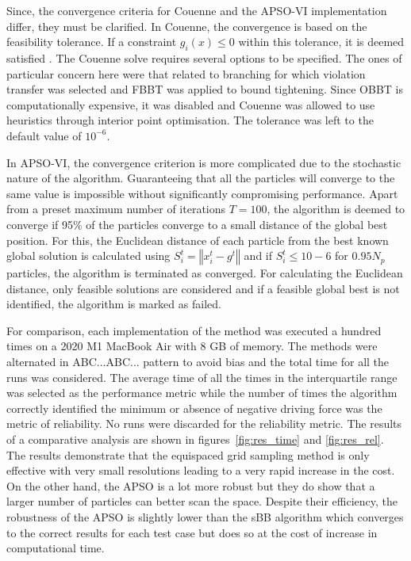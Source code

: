	Since, the convergence criteria for Couenne and the APSO-VI implementation differ, they must be clarified. In Couenne, the convergence is based on the feasibility tolerance. If a constraint $g_i(x) \leq 0$ within this tolerance, it is deemed satisfied \cite{Belotti:2022aa}. The Couenne solve requires several options to be specified. The ones of particular concern here were that related to branching for which violation transfer was selected and FBBT was applied to bound tightening. Since OBBT is computationally expensive, it was disabled and Couenne was allowed to use heuristics through interior point optimisation. The tolerance was left to the default value of ${10^{-6}}$.
	
	In APSO-VI, the convergence criterion is more complicated due to the stochastic nature of the algorithm. Guaranteeing that all the particles will converge to the same value is impossible without significantly compromising performance. Apart from a preset maximum number of iterations $T = 100$, the algorithm is deemed to converge if 95\% of the particles converge to a small distance of the global best position. For this, the Euclidean distance of each particle from the best known global solution is calculated using $S_i^t = \left \Vert x_i^t - g^t\right \Vert$ and if $S_i^t \leq 10-6$ for $0.95 N_p$ particles, the algorithm is terminated as converged. For calculating the Euclidean distance, only feasible solutions are considered and if a feasible global best is not identified, the algorithm is marked as failed.
	
	For comparison, each implementation of the method was executed a hundred times on a 2020 M1 MacBook Air with 8 GB of memory. The methods were alternated in ABC...ABC... pattern to avoid bias and the total time for all the runs was considered. The average time of all the times in the interquartile range was selected as the performance metric while the number of times the algorithm correctly identified the minimum or absence of negative driving force was the metric of reliability. No runs were discarded for the reliability metric. The results of a comparative analysis are shown in figures~\ref{fig:res_time} and \ref{fig:res_rel}. The results demonstrate that the equispaced grid sampling method is only effective with very small resolutions leading to a very rapid increase in the cost. On the other hand, the APSO is a lot more robust but they do show that a larger number of particles can better scan the space. Despite their efficiency, the robustness of the APSO is slightly lower than the sBB algorithm which converges to the correct results for each test case but does so at the cost of increase in computational time. 

